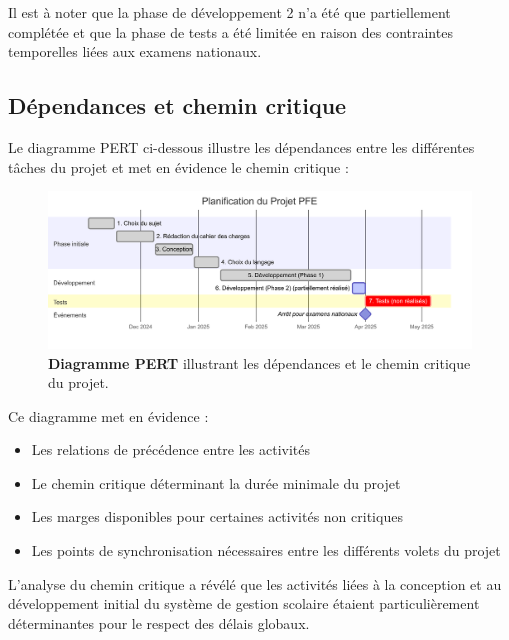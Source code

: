 Il est à noter que la phase de développement 2 n'a été que partiellement complétée et que la phase de tests a été limitée en raison des contraintes temporelles liées aux examens nationaux.

\subsection{Dépendances et chemin critique}

Le diagramme PERT ci-dessous illustre les dépendances entre les différentes tâches du projet et met en évidence le chemin critique :

\begin{figure}[H]
  \centering
  \includegraphics[width=1.0\textwidth,keepaspectratio]{pfe-pics/diagrames/Mermaid Chart - Create complex, visual diagrams with text. A smarter way of creating diagrams.-2025-06-10-203842.png}
  \caption{\textbf{Diagramme PERT} illustrant les dépendances et le chemin critique du projet.}
  \label{fig:pert_diagram}
\end{figure}

Ce diagramme met en évidence :

\begin{itemize}
  \item Les relations de précédence entre les activités
  
  \item Le chemin critique déterminant la durée minimale du projet
  
  \item Les marges disponibles pour certaines activités non critiques
  
  \item Les points de synchronisation nécessaires entre les différents volets du projet
\end{itemize}

L'analyse du chemin critique a révélé que les activités liées à la conception et au développement initial du système de gestion scolaire étaient particulièrement déterminantes pour le respect des délais globaux.

